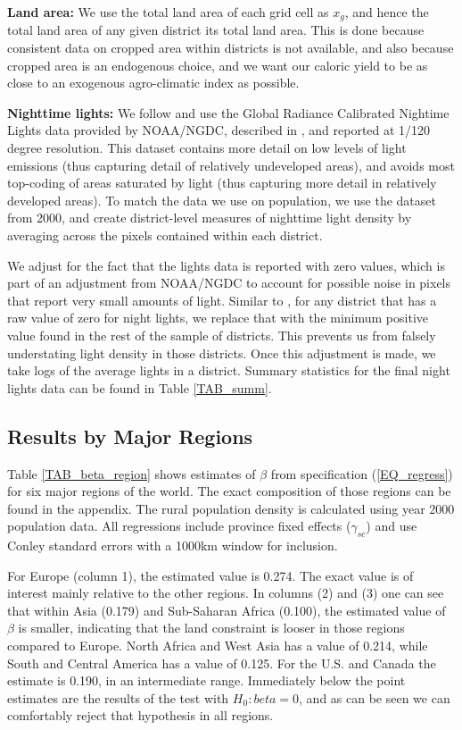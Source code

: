 \documentclass[11pt]{article}
\begin{document}
\vspace{.5cm}\noindent\textbf{Land area:} We use the total land area of each grid cell as $x_g$, and hence the total land area of any given district its total land area. This is done because consistent data on cropped area within districts is not available, and also because cropped area is an endogenous choice, and we want our caloric yield to be as close to an exogenous agro-climatic index as possible.

\vspace{.5cm}\noindent\textbf{Nighttime lights:} We follow \citet{hssw2016} and use the Global Radiance Calibrated Nightime Lights data provided by NOAA/NGDC, described in \citet{Elvidge1999}, and reported at 1/120 degree resolution. This dataset contains more detail on low levels of light emissions (thus capturing detail of relatively undeveloped areas), and avoids most top-coding of areas saturated by light (thus capturing more detail in relatively developed areas). To match the data we use on population, we use the dataset from 2000, and create district-level measures of nighttime light density by averaging across the pixels contained within each district.

We adjust for the fact that the lights data is reported with zero values, which is part of an adjustment from NOAA/NGDC to account for possible noise in pixels that report very small amounts of light. Similar to \citet{hssw2016}, for any district that has a raw value of zero for night lights, we replace that with the minimum positive value found in the rest of the sample of districts. This prevents us from falsely understating light density in those districts. Once this adjustment is made, we take logs of the average lights in a district. Summary statistics for the final night lights data can be found in Table \ref{TAB_summ}.

\subsection{Results by Major Regions} 
Table \ref{TAB_beta_region} shows estimates of $\beta$ from specification (\ref{EQ_regress}) for six major regions of the world. The exact composition of those regions can be found in the appendix. The rural population density is calculated using year 2000 population data. All regressions include province fixed effects ($\gamma_{sc}$) and use Conley standard errors with a 1000km window for inclusion.

For Europe (column 1), the estimated value is 0.274. The exact value is of interest mainly relative to the other regions. In columns (2) and (3) one can see that within Asia (0.179) and Sub-Saharan Africa (0.100), the estimated value of $\beta$ is smaller, indicating that the land constraint is looser in those regions compared to Europe. North Africa and West Asia has a value of 0.214, while South and Central America has a value of 0.125. For the U.S. and Canada the estimate is 0.190, in an intermediate range. Immediately below the point estimates are the results of the test with $H_0: beta = 0$, and as can be seen we can comfortably reject that hypothesis in all regions.
\end{document}
